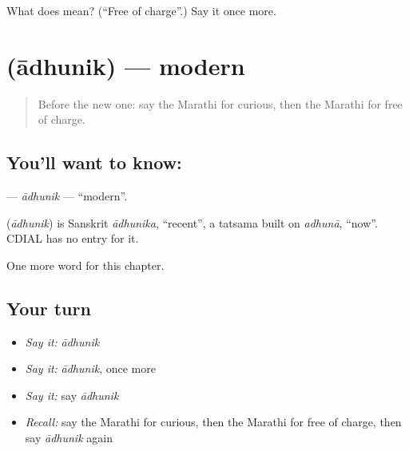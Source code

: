 \begin{tcolorbox}[breakable,colback=teal!4,colframe=teal!35!black,title={Before you move on}]
What does  mean? (\textquotedblleft{}Free of charge\textquotedblright{}.) Say it once more.
\end{tcolorbox}
\section[\texorpdfstring{\mr{आधुनिक} (ādhunik)}{आधुनिक (ādhunik)}]{ (ādhunik) — modern}

\label{lesson:MR-C205-adhunik}



\begin{quote}
Before the new one: say the Marathi for curious, then the Marathi for free of charge.
\end{quote}

\subsection*{You'll want to know: }
\textbf{} — \emph{ādhunik} — \textquotedblleft{}modern\textquotedblright{}.

\begin{cousinweb}
\textbf{} (\emph{ādhunik}) is Sanskrit \emph{ādhunika}, \textquotedblleft{}recent\textquotedblright{}, a tatsama built on \emph{adhunā}, \textquotedblleft{}now\textquotedblright{}. CDIAL has no entry for it.
\end{cousinweb}

\begin{grammarlens}[title={What you've built}]
One more word for this chapter.
\end{grammarlens}

\subsection*{Your turn}
\begin{itemize}
\raggedright
  \item \emph{Say it:} \emph{ādhunik}
  \item \emph{Say it:} \emph{ādhunik}, once more
  \item \emph{Say it:} say \emph{ādhunik}
  \item \emph{Recall:} say the Marathi for curious, then the Marathi for free of charge, then say \emph{ādhunik} again
\end{itemize}

